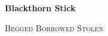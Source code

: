 \documentclass[letterpaper,12pt]{lilypond-book}
\begin{document}
\begin{center}
    {\fontsize{24pt}{24pt}\textbf{Blackthorn Stick}}\\
\end{center}

\begin{flushright}
    \textsc{Begged Borrowed Stolen}
\end{flushright}

\end{document}
